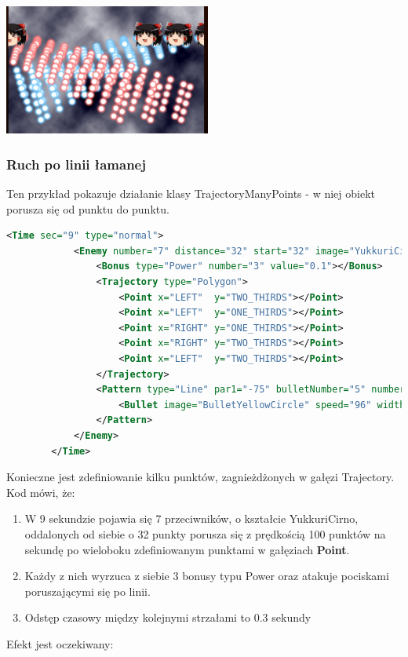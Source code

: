 		\begin{center}
			\includegraphics[width=0.51\textwidth]{./images/test2}
		\end{center}
		
		\newpage
		\subsubsection{Ruch po linii łamanej}
		Ten przykład pokazuje działanie klasy TrajectoryManyPoints - w niej obiekt porusza się od punktu do punktu.
		\begin{lstlisting}[language=xml]
		<Time sec="9" type="normal">
			<Enemy number="7" distance="32" start="32" image="YukkuriCirno" life="100" speed="200" length="800">
				<Bonus type="Power" number="3" value="0.1"></Bonus>
				<Trajectory type="Polygon">
					<Point x="LEFT"  y="TWO_THIRDS"></Point>
					<Point x="LEFT"  y="ONE_THIRDS"></Point>
					<Point x="RIGHT" y="ONE_THIRDS"></Point>
					<Point x="RIGHT" y="TWO_THIRDS"></Point>
					<Point x="LEFT"  y="TWO_THIRDS"></Point>
				</Trajectory>
				<Pattern type="Line" par1="-75" bulletNumber="5" number="20" interval="0.3">
					<Bullet image="BulletYellowCircle" speed="96" width="32" height="32" hitboxSize="HALF"></Bullet>
				</Pattern>
			</Enemy>
		</Time>
		\end{lstlisting}
		Konieczne jest zdefiniowanie kilku punktów, zagnieżdżonych w gałęzi Trajectory. Kod mówi, że:
		\begin{enumerate}
			\item W 9 sekundzie pojawia się 7 przeciwników, o kształcie YukkuriCirno, oddalonych od siebie o 32 punkty porusza się z prędkością 100 punktów na sekundę po wieloboku zdefiniowanym punktami w gałęziach \textbf{Point}.
			\item Każdy z nich wyrzuca z siebie 3 bonusy typu Power oraz atakuje pociskami poruszającymi się po linii.
			\item Odstęp czasowy między kolejnymi strzałami to 0.3 sekundy
		\end{enumerate}
		Efekt jest oczekiwany:
